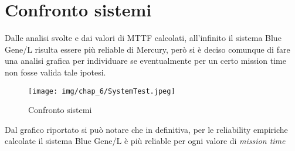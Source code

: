 \section{Confronto sistemi}
Dalle analisi svolte e dai valori di MTTF calcolati, all'infinito il sistema Blue Gene/L risulta essere più reliable di Mercury, però si è deciso comunque di fare una analisi grafica per individuare se eventualmente per un certo mission time non fosse valida tale ipotesi.\\
\begin{figure}[H]
	\centering
	\texttt{[image: img/chap\_6/SystemTest.jpeg]}
	\caption{Confronto sistemi}
	\label{fig:SystemTesing}
\end{figure}
\noindent
Dal grafico riportato si può notare che in definitiva, per le reliability empiriche calcolate il sistema Blue Gene/L è più reliable per ogni valore di \textit{mission time}